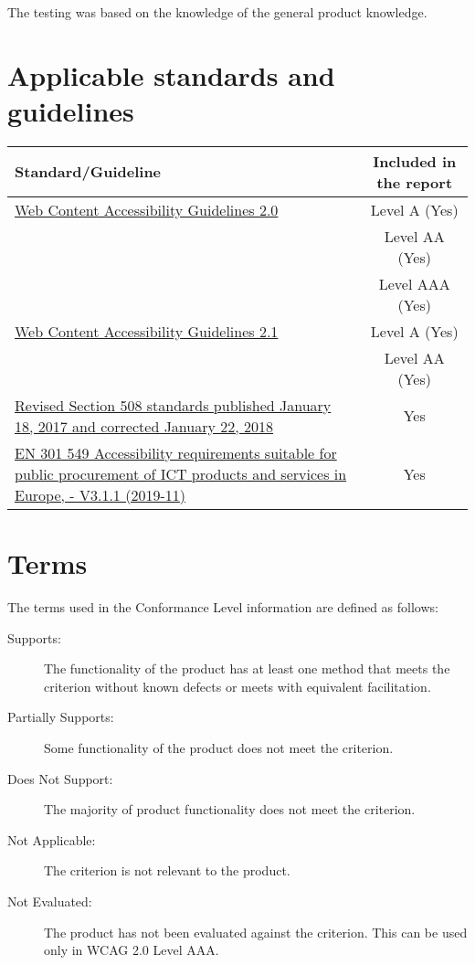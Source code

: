 \documentclass[a4paper]{report}
\begin{document}
The testing was based on the knowledge of the general product
knowledge.

\section{Applicable standards and guidelines}
\label{sec:standards}

{\centering
\begin{tabularx}{\textwidth}{Xc}
  \toprule
  Standard/Guideline  & Included in the report\\
  \midrule
  \href{http://www.w3.org/TR/2008/REC-WCAG20-20081211}{Web Content
  Accessibility Guidelines 2.0} & Level A (Yes) \\
                      & Level AA (Yes)\\
                      & Level AAA (Yes)\\
  \href{https://www.w3.org/TR/WCAG21}{Web Content Accessibility
  Guidelines 2.1} & Level A (Yes) \\
  & Level AA (Yes)\\
  \href{https://www.access-board.gov/guidelines-and-standards/communications-and-it/about-the-ict-refresh/final-rule/text-of-the-standards-and-guidelines}{Revised Section 508 standards published January 18, 2017 and
  corrected January 22, 2018} & Yes\\
  \href{https://www.etsi.org/deliver/etsi_en/301500_301599/301549/03.01.01_60/en_301549v030101p.pdf}{EN
  301 549 Accessibility requirements suitable for public procurement
  of ICT products and services in Europe, - V3.1.1 (2019-11)} & Yes\\
  \bottomrule
\end{tabularx}
\par}

\section{Terms}
\label{sec:terms}

The terms used in the Conformance Level information are defined as follows:
\begin{description}
\item[Supports:] The functionality of the product has at least one
  method that meets the criterion without known defects or meets with
  equivalent facilitation.
\item[Partially Supports:] Some functionality of the product does not
  meet the criterion.
\item[Does Not Support:] The majority of product functionality does
  not meet the criterion.
\item[Not Applicable:] The criterion is not relevant to the product.
\item[Not Evaluated:] The product has not been evaluated against the
  criterion. This can be used only in WCAG 2.0 Level AAA.

\end{description}
\end{document}
